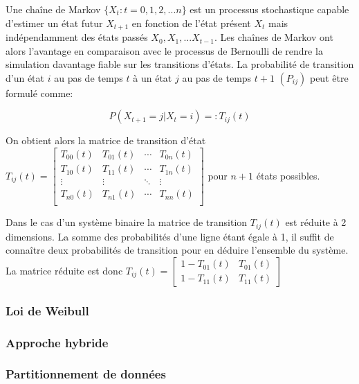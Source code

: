 Une chaîne de Markov $\lbrace X_{t}:t=0,1,2,...n\rbrace$ est un processus stochastique capable d'estimer un état futur $X_{t+1}$ en fonction de l'état présent $X_{t}$ mais indépendamment des états passés $X_{0}, X_{1}, ...X_{t-1}$. Les chaînes de Markov ont alors l'avantage en comparaison avec le processus de Bernoulli de rendre la simulation davantage fiable sur les transitions d'états. La probabilité de transition d'un état $i$ au pas de temps $t$ à un état $j$ au pas de temps $t+1$ $(P_{ij})$ peut être formulé comme:

\begin{equation}
P(X_{t+1}=j|X_{t}=i)=:T_{ij}(t)
\end{equation}

On obtient alors la matrice de transition d'état $ T_{ij}(t)= \begin{bmatrix}
        T_{00}(t) & T_{01}(t) & \cdots & T_{0n}(t)\\
        T_{10}(t) & T_{11}(t) & \cdots & T_{1n}(t)\\
        \vdots & \vdots & \ddots & \vdots\\
        T_{n0}(t) & T_{n1}(t) & \cdots & T_{nn}(t)\\
     \end{bmatrix}$ pour $n+1$ états possibles.
     
Dans le cas d'un système binaire la matrice de transition $ T_{ij}(t)$ est réduite à 2 dimensions. La somme des probabilités d'une ligne étant égale à 1, il suffit de connaître deux probabilités de transition pour en déduire l'ensemble du système. La matrice réduite est donc $T_{ij}(t)= \begin{bmatrix}
        1-T_{01}(t) & T_{01}(t)\\
        1-T_{11}(t) & T_{11}(t)       
     \end{bmatrix}$

\subsubsection{Loi de Weibull}

\subsubsection{Approche hybride}

\subsubsection{Partitionnement de données}

